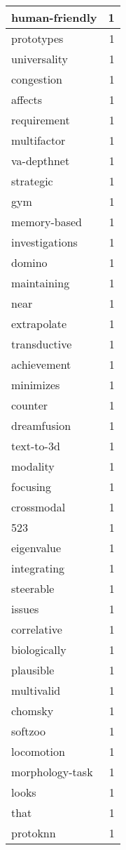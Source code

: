 \begin{table}[h]
\begin{tabular}{|l|r|}
\hline
human-friendly & 1 \\
\hline
prototypes & 1 \\
\hline
universality & 1 \\
\hline
congestion & 1 \\
\hline
affects & 1 \\
\hline
requirement & 1 \\
\hline
multifactor & 1 \\
\hline
va-depthnet & 1 \\
\hline
strategic & 1 \\
\hline
gym & 1 \\
\hline
memory-based & 1 \\
\hline
investigations & 1 \\
\hline
domino & 1 \\
\hline
maintaining & 1 \\
\hline
near & 1 \\
\hline
extrapolate & 1 \\
\hline
transductive & 1 \\
\hline
achievement & 1 \\
\hline
minimizes & 1 \\
\hline
counter & 1 \\
\hline
dreamfusion & 1 \\
\hline
text-to-3d & 1 \\
\hline
modality & 1 \\
\hline
focusing & 1 \\
\hline
crossmodal & 1 \\
\hline
523 & 1 \\
\hline
eigenvalue & 1 \\
\hline
integrating & 1 \\
\hline
steerable & 1 \\
\hline
issues & 1 \\
\hline
correlative & 1 \\
\hline
biologically & 1 \\
\hline
plausible & 1 \\
\hline
multivalid & 1 \\
\hline
chomsky & 1 \\
\hline
softzoo & 1 \\
\hline
locomotion & 1 \\
\hline
morphology-task & 1 \\
\hline
looks & 1 \\
\hline
that & 1 \\
\hline
protoknn & 1 \\

\end{tabular}
\end{table}
